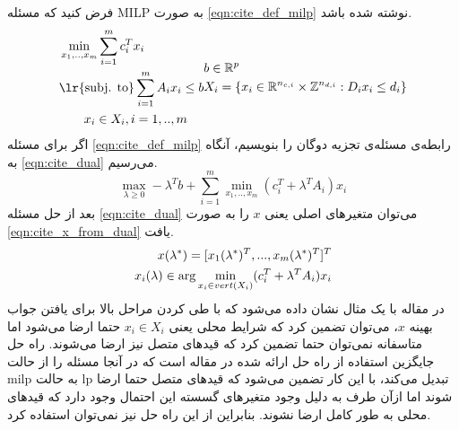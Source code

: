 	فرض کنید که مسئله MILP به صورت \cref{eqn:cite_def_milp} نوشته شده باشد. 
	\begin{subequations}
		\begin{align}\label{eqn:cite_def_milp}
			&\min_{x_1,..,x_m} \sum_{i=1}^m c_i^Tx_i \notag \\
			&\text{\lr{subj. to}} \sum_{i=1}^m A_ix_i \le b \notag \\
			&\quad\quad x_i \in X_i, i = 1,..,m
		\end{align}
		\begin{align}
			&b \in \mathbb{R}^p \notag \\
			&X_i = \{x_i\in \mathbb{R}^{n_{c,i}}\times \mathbb{Z}^{n_{d,i}}:D_ix_i \le d_i\}
		\end{align}
	\end{subequations}
	اگر برای مسئله \cref{eqn:cite_def_milp} رابطه‌ی مسئله‌ی تجزیه دوگان را بنویسیم، آنگاه به \cref{eqn:cite_dual}  می‌رسیم. 
	\begin{equation}\label{eqn:cite_dual}
		\max_{\lambda \ge 0} - \lambda^Tb + \sum_{i=1}^m \min_{x_1,..,x_m}(c_i^T + \lambda^TA_i)x_i
	\end{equation}
	بعد از حل مسئله \cref{eqn:cite_dual} می‌توان متغیرهای اصلی یعنی $x$ را به صورت \cref{eqn:cite_x_from_dual} یافت. 
	\begin{align}\label{eqn:cite_x_from_dual}
		x(\lambda^*) = [x_1(\lambda^*)^T, ..., x_m(\lambda^*)^T]^T \notag \\
		x_i(\lambda) \in \arg \min_{x_i \in vert(X_i)} (c_i^T + \lambda^TA_i)x_i
	\end{align}
	در مقاله \cite{decentralized_approach} با یک مثال نشان داده می‌شود که با طی کردن مراحل بالا برای یافتن جواب بهینه $x$، می‌توان تضمین کرد که شرایط محلی یعنی $x_i \in X_i$ حتما ارضا می‌شود اما متاسفانه نمی‌توان حتما تضمین کرد که قیدهای متصل نیز ارضا می‌شوند. راه حل جایگزین استفاده از راه حل ارائه شده در مقاله \cite{shor2012minimization} است که در آنجا مسئله را از حالت milp به حالت lp تبدیل می‌کند، با این کار تضمین می‌شود که قیدهای متصل حتما ارضا شوند اما ازآن طرف به دلیل وجود متغیرهای گسسته این احتمال وجود دارد که قیدهای محلی به طور کامل ارضا نشوند. بنابراین از این راه حل نیز نمی‌توان استفاده کرد. 
	
